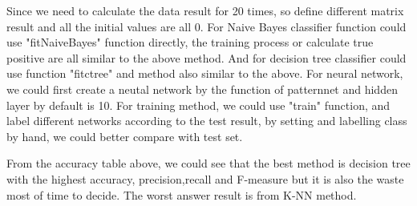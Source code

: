 \documentclass[]{article}
\begin{document}
Since we need to calculate the data result for 20 times, so define different matrix result and all the initial values are all 0. For Naive Bayes classifier function could use "fitNaiveBayes" function directly, the training process or calculate true positive are all similar to the above method. And for decision tree classifier could use function "fitctree" and method also similar to the above. For neural network, we could first create a neutal network by the function of patternnet and hidden layer by default is 10. For training method, we could use "train" function, and label different networks according to the test result, by setting and labelling class by hand, we could better compare with test set.

From the accuracy table above, we could see that the best method is decision tree with the highest accuracy, precision,recall and F-measure but it is also the waste most of time to decide. The worst answer result is from K-NN method.
\end{document}
